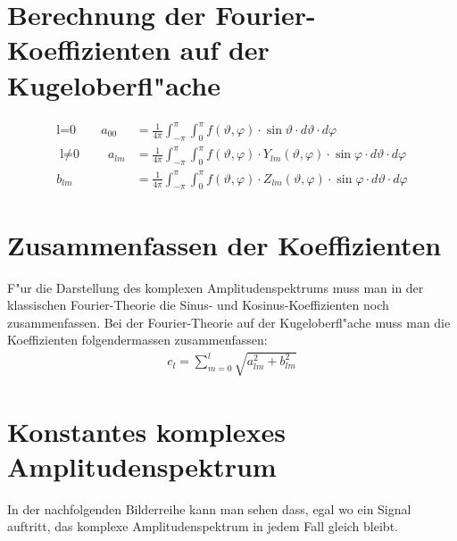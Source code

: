 \begin{refsection}
\section{Berechnung der Fourier-Koeffizienten auf der Kugeloberfl"ache} 
\begin{align*}
\text{l=0} \qquad a_{00}&=\frac{1}{4\pi} \int_{-\pi}^\pi \int_{0}^\pi f(\vartheta,\varphi) \cdot \sin\vartheta \cdot d\vartheta \cdot d\varphi
\\
\text{l$\neq$0} \qquad a_{lm}&=\frac{1}{4\pi} \int_{-\pi}^\pi \int_{0}^\pi f(\vartheta,\varphi) \cdot Y_{lm} (\vartheta, \varphi) \cdot \sin\varphi \cdot d\vartheta \cdot d\varphi
\\
b_{lm}&=\frac{1}{4\pi} \int_{-\pi}^\pi \int_{0}^\pi f(\vartheta,\varphi) \cdot Z_{lm} (\vartheta, \varphi) \cdot \sin\varphi \cdot d\vartheta \cdot d\varphi
\end{align*}

\section{Zusammenfassen der Koeffizienten} 
F"ur die Darstellung des komplexen Amplitudenspektrums muss man in der klassischen Fourier-Theorie die Sinus- und Kosinus-Koeffizienten noch zusammenfassen. Bei der Fourier-Theorie auf der Kugeloberfl"ache muss man die Koeffizienten folgendermassen zusammenfassen:
\begin{align*}
c_l=\sum_{m=0}^l \sqrt{a^2_{lm}+b^2_{lm}}
\end{align*}

\section{Konstantes komplexes Amplitudenspektrum}

In der nachfolgenden Bilderreihe kann man sehen dass, egal wo ein Signal auftritt, das komplexe Amplitudenspektrum in jedem Fall gleich bleibt.\\


\end{refsection}
